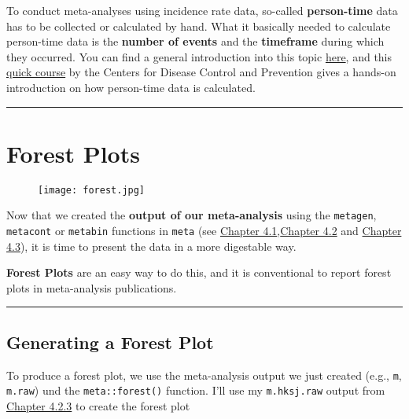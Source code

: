 \documentclass[]{book}
\theoremstyle{definition}
\theoremstyle{definition}
\theoremstyle{definition}
\theoremstyle{remark}
\begin{document}
To conduct meta-analyses using incidence rate data, so-called
\textbf{person-time} data has to be collected or calculated by hand.
What it basically needed to calculate person-time data is the
\textbf{number of events} and the \textbf{timeframe} during which they
occurred. You can find a general introduction into this topic
\href{https://sph.unc.edu/files/2015/07/nciph_ERIC4.pdf}{here}, and this
\href{https://www.cdc.gov/ophss/csels/dsepd/ss1978/lesson3/section2.html}{quick
course} by the Centers for Disease Control and Prevention gives a
hands-on introduction on how person-time data is calculated.

\begin{center}\rule{0.5\linewidth}{\linethickness}\end{center}

\chapter{Forest Plots}\label{forest-plots}

\begin{figure}
\centering
\texttt{[image: forest.jpg]}
\caption{}
\end{figure}

\begin{rmdinfo}
Now that we created the \textbf{output of our meta-analysis} using the
\texttt{metagen}, \texttt{metacont} or \texttt{metabin} functions in
\texttt{meta} (see \protect\hyperlink{fixed}{Chapter
4.1},\protect\hyperlink{random}{Chapter 4.2} and
\protect\hyperlink{binary}{Chapter 4.3}), it is time to present the data
in a more digestable way.

\textbf{Forest Plots} are an easy way to do this, and it is conventional
to report forest plots in meta-analysis publications.
\end{rmdinfo}

\begin{center}\rule{0.5\linewidth}{\linethickness}\end{center}

\section{Generating a Forest Plot}\label{generating-a-forest-plot}

To produce a forest plot, we use the meta-analysis output we just
created (e.g., \texttt{m}, \texttt{m.raw}) und the
\texttt{meta::forest()} function. I'll use my \texttt{m.hksj.raw} output
from \protect\hyperlink{random.raw}{Chapter 4.2.3} to create the forest
plot
\end{document}
